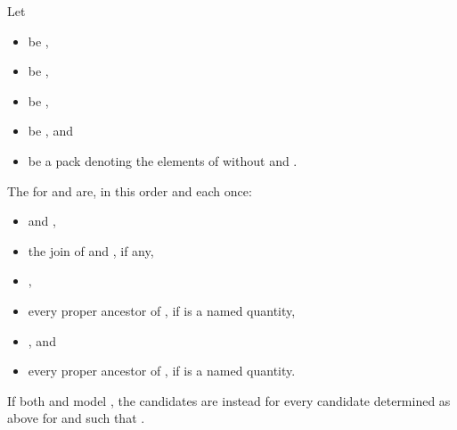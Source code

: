 \begin{itemdescr}
\pnum
Let
\begin{itemize}
\item
{} be ,
\item
{} be ,
\item
{} be ,
\item
{} be , and
\item
{} be a pack denoting the elements of  without  and .
\end{itemize}

\pnum
The  for  and  are, in this order and each once:
\begin{itemize}
\item
{} and ,
\item
the join of  and , if any,
\item
{},
\item
every proper ancestor of , if  is a named quantity,
\item
{}, and
\item
every proper ancestor of , if  is a named quantity.
\end{itemize}
If both  and  model ,
the candidates are instead  for every candidate  determined as above
for  and  such that .


\end{itemdescr}
